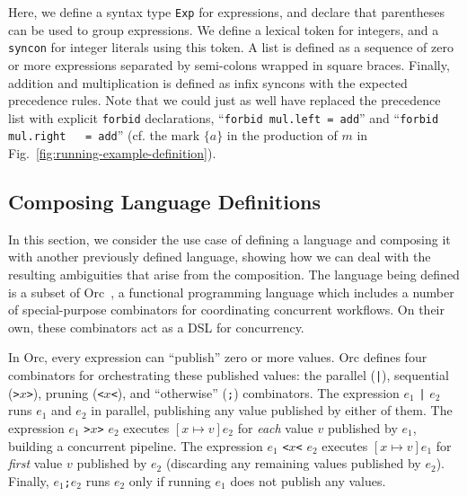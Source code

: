 \documentclass[acmsmall,review,anonymous]{acmart}\settopmatter{printfolios=true,printccs=false,printacmref=false}
\newcommand{\ocaml}{\lstinline[language={[objective]caml}]}
\newcommand{\syncon}{\lstinline[language=syncon]}
\begin{document}
\noindent Here, we define a syntax type \syncon{Exp} for
expressions, and declare that parentheses can be used to group
expressions. We define a lexical token for integers, and a
\syncon{syncon} for integer literals using this token. A list is
defined as a sequence of zero or more expressions separated by
semi-colons wrapped in square braces. Finally, addition and
multiplication is defined as infix syncons with the expected
precedence rules. Note that we could just as well have replaced
the precedence list with explicit \syncon{forbid} declarations,
``\syncon{forbid mul.left = add}'' and ``\syncon{forbid mul.right
  = add}'' (cf. the mark $\{a\}$ in the production of $m$ in
Fig.~\ref{fig:running-example-definition}).



\subsection{Composing Language Definitions} \label{sec:evaluation-orc}

In this section, we consider the use case of defining a language
and composing it with another previously defined language, showing
how we can deal with the resulting ambiguities that arise from the
composition.
%
The language being defined is a subset of
Orc~\cite{kitchinOrc2009}, a functional programming language which
includes a number of special-purpose combinators for coordinating
concurrent workflows. On their own, these combinators act as a DSL
for concurrency.

In Orc, every expression can ``publish'' zero or more values. Orc
defines four combinators for orchestrating these published values:
the parallel (\ocaml{|}), sequential (\ocaml{>}$x$\ocaml{>}),
pruning (\ocaml{<}$x$\ocaml{<}), and ``otherwise'' (\ocaml{;})
combinators.
%
The expression $e_1$ \ocaml{|} $e_2$ runs $e_1$ and
$e_2$ in parallel, publishing any value published by either of
them.
%
The expression $e_1$ \ocaml{>}$x$\ocaml{>} $e_2$ executes
$[x\mapsto v]e_2$ for \emph{each} value $v$ published by $e_1$,
building a concurrent pipeline.
%
The expression $e_1$ \ocaml{<}$x$\ocaml{<} $e_2$ executes
$[x\mapsto v]e_1$ for \emph{first} value $v$ published by $e_2$
(discarding any remaining values published by $e_2$).
%
Finally, $e_1$\ocaml{;}$e_2$ runs $e_2$ only if running $e_1$ does
not publish any values.
\end{document}
